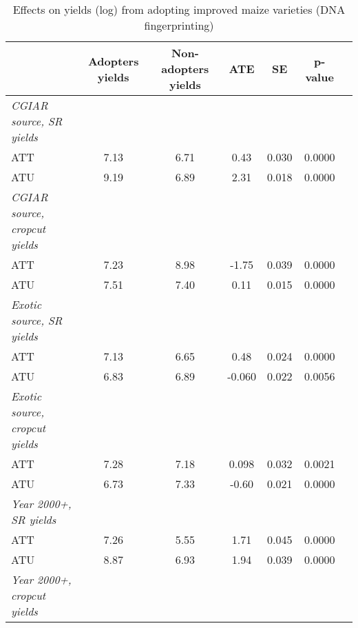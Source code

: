 \begin{table}[htbp]
\centering
\hspace*{-1.2cm}
\begin{threeparttable}
\caption{Effects on yields (log) from adopting improved maize varieties (DNA fingerprinting)}
\label{tab:switching}
\begin{tabular}{l cccccc}
\hline
\hline
            &Adopters yields&Non-adopters yields&        ATE&          SE&     p-value\\
\hline
\textit{CGIAR source, SR yields}&            &            &            &            &            \\
ATT         &        7.13&        6.71&        0.43&       0.030&      0.0000\\
%
%
%
ATU         &        9.19&        6.89&        2.31&       0.018&      0.0000\\
%
%
%
\textit{CGIAR source, cropcut yields}&            &            &            &            &            \\
ATT         &        7.23&        8.98&       -1.75&       0.039&      0.0000\\
%
%
%
ATU         &        7.51&        7.40&        0.11&       0.015&      0.0000\\
%
%
%
\textit{Exotic source, SR yields}&            &            &            &            &            \\
ATT         &        7.13&        6.65&        0.48&       0.024&      0.0000\\
%
%
%
ATU         &        6.83&        6.89&      -0.060&       0.022&      0.0056\\
%
%
%
\textit{Exotic source, cropcut yields}&            &            &            &            &            \\
ATT         &        7.28&        7.18&       0.098&       0.032&      0.0021\\
%
%
%
ATU         &        6.73&        7.33&       -0.60&       0.021&      0.0000\\
%
%
%
\textit{Year 2000+, SR yields}&            &            &            &            &            \\
ATT         &        7.26&        5.55&        1.71&       0.045&      0.0000\\
%
%
%
ATU         &        8.87&        6.93&        1.94&       0.039&      0.0000\\
%
%
%
\textit{Year 2000+, cropcut yields}&            &            &            &            &            \\

\end{tabular}
\end{threeparttable}
\end{table}
